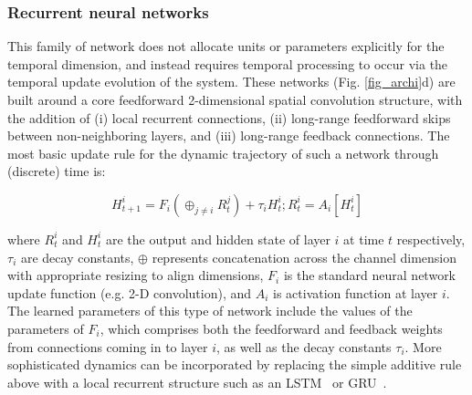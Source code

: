 \subsubsection*{Recurrent neural networks}

This family of network does not allocate units or parameters explicitly for the temporal dimension, and instead requires temporal processing to occur via the temporal update evolution of the system.  These networks (Fig. \ref{fig_archi}d) are built around a core feedforward 2-dimensional spatial convolution structure, with the addition of (i) local recurrent connections, (ii) long-range feedforward skips between non-neighboring layers, and (iii) long-range feedback connections.  
The most basic update rule for the dynamic trajectory of such a network through (discrete) time is: 

$$H^i_{t+1} = F_i \left ( \oplus_{j \neq i} R^j_t \right )  + \tau_i H^i_t; R^i_t = A_i[H^i_t]$$

where $R^i_t$ and $H^i_t$ are the output and hidden state of layer $i$ at time $t$ respectively,  $\tau_i$  are decay constants, $\oplus$ represents concatenation across the channel dimension with appropriate resizing to align dimensions, $F_i$ is the standard neural network update function (e.g. 2-D convolution), and $A_i$ is activation function at layer $i$.  
The learned parameters of this type of network include the values of the parameters of $F_i$, which comprises both the feedforward and feedback weights from connections coming in to layer $i$, as well as the decay constants $\tau_i$. 
More sophisticated dynamics can be incorporated by replacing the simple additive rule above with a local recurrent structure such as an LSTM~\cite{} or GRU~\cite{}.


